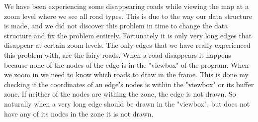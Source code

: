 We have been experiencing some disappearing roads while viewing the map at a zoom level where we see all road types. This is due to the way our data structure is made, and we did not discover this problem in time to change the data structure and fix the problem entirely. Fortunately it is only very long edges that disappear at certain zoom levels. The only edges that we have really experienced this problem with, are the fairy roads. When a road disappears it happens because none of the nodes of the edge is in the "viewbox" of the program. When we zoom in we need to know which roads to draw in the frame. This is done my checking if the coordinates of an edge's nodes is within the "viewbox" or its buffer zone. If neither of the nodes are withing the zone, the edge is not drawn. So naturally when a very long edge should be drawn in the "viewbox", but does not have any of its nodes in the zone it is not drawn. 